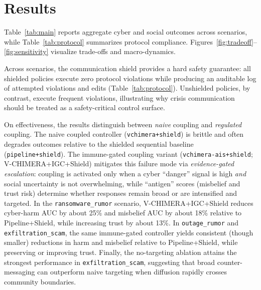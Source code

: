 \documentclass[biomimetics,article,submit,pdftex,moreauthors]{Definitions/mdpi}
\begin{document}
\section{Results}
\label{sec:results}

Table~\ref{tab:main} reports aggregate cyber and social outcomes across scenarios, while Table~\ref{tab:protocol} summarizes protocol compliance. Figures~\ref{fig:tradeoff}--\ref{fig:sensitivity} visualize trade-offs and macro-dynamics.

\begin{table}[t]
\centering
\caption{Main results (mean $\pm$ SD over seeds). Lower is better for cyber harm and misbelief; higher is better for trust. ``Exec. viol.'' counts executed protocol violations (0 for all shielded policies). ``Shield edits'' counts runtime interventions by the communication shield. Boldface indicates the best shielded result per scenario for each primary metric.}
\label{tab:main}
\small
\setlength{\tabcolsep}{3pt}
\resizebox{\linewidth}{!}{}
\end{table}

Across scenarios, the communication shield provides a hard safety guarantee: all shielded policies execute zero protocol violations while producing an auditable log of attempted violations and edits (Table~\ref{tab:protocol}). Unshielded policies, by contrast, execute frequent violations, illustrating why crisis communication should be treated as a safety-critical control surface.

On effectiveness, the results distinguish between \emph{naive} coupling and \emph{regulated} coupling. The naive coupled controller (\texttt{vchimera+shield}) is brittle and often degrades outcomes relative to the shielded sequential baseline (\texttt{pipeline+shield}). The immune-gated coupling variant (\texttt{vchimera-ais+shield}; V-CHIMERA+IGC+Shield) mitigates this failure mode via \emph{evidence-gated escalation}: coupling is activated only when a cyber ``danger'' signal is high \emph{and} social uncertainty is not overwhelming, while ``antigen'' scores (misbelief and trust risk) determine whether responses remain broad or are intensified and targeted. In the \texttt{ransomware\_rumor} scenario, V-CHIMERA+IGC+Shield reduces cyber-harm AUC by about 25\% and misbelief AUC by about 18\% relative to Pipeline+Shield, while increasing trust by about 13\%. In \texttt{outage\_rumor} and \texttt{exfiltration\_scam}, the same immune-gated controller yields consistent (though smaller) reductions in harm and misbelief relative to Pipeline+Shield, while preserving or improving trust. Finally, the no-targeting ablation attains the strongest performance in \texttt{exfiltration\_scam}, suggesting that broad counter-messaging can outperform naive targeting when diffusion rapidly crosses community boundaries.
\end{document}
